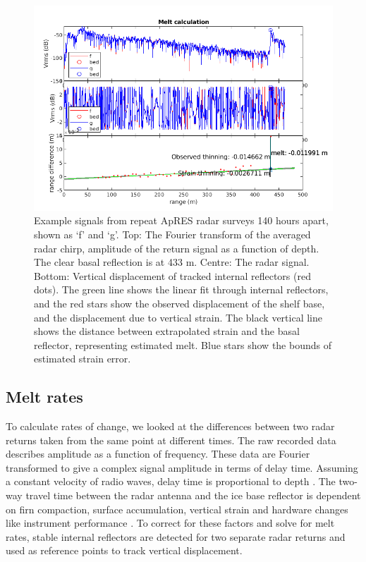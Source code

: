 \begin{figure}[!ht]
\centering
\includegraphics[width=1\textwidth]{chapters/3/melt_calc.png}
\caption[ApRES example]{Example signals from repeat ApRES radar surveys 140 hours apart, shown as `f' and `g'. Top: The Fourier transform of the averaged radar chirp, amplitude of the return signal as a function of depth. The clear basal reflection is at 433 m. Centre: The radar signal.
Bottom: Vertical displacement of tracked internal reflectors (red dots). The green line shows the linear fit through internal reflectors, and the red stars show the observed displacement of the shelf base, and the displacement due to vertical strain. The black vertical line shows the distance between extrapolated strain and the basal reflector, representing estimated melt. Blue stars show the bounds of estimated strain error. }
\label{fig:example_signal}
\end{figure}

\subsection{Melt rates} \label{sec:apres_meltrates}

To calculate rates of change, we looked at the differences between two radar returns taken from the same point at different times.
The raw recorded data describes amplitude as a function of frequency. These data are Fourier transformed to give a complex signal amplitude in terms of delay time. Assuming a constant velocity of radio waves, delay time is proportional to depth \citep{nicholls2015ground}. 
The two-way travel time between the radar antenna and the ice base reflector is dependent on firn compaction, surface accumulation, vertical strain and hardware changes like instrument performance \citep{nicholls2015ground}. To correct for these factors and solve for melt rates, stable internal reflectors are detected for two separate radar returns and used as reference points to track vertical displacement. 


